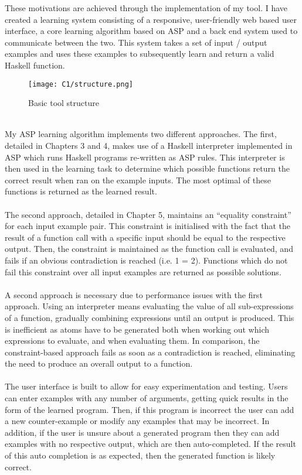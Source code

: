 These motivations are achieved through the implementation of my tool. I have created a learning system consisting of a responsive, user-friendly web based user interface, a core learning algorithm based on ASP and a back end system used to communicate between the two. This system takes a set of input / output examples and uses these examples to subsequently learn and return a valid Haskell function. \\

\begin{figure}[h!]
\texttt{[image: C1/structure.png]}
\caption{Basic tool structure}
\end{figure}
\mbox{}\\
My ASP learning algorithm implements two different approaches. The first, detailed in Chapters 3 and 4, makes use of a Haskell interpreter implemented in ASP which runs Haskell programs re-written as ASP rules. This interpreter is then used in the learning task to determine which possible functions return the correct result when ran on the example inputs. The most optimal of these functions is returned as the learned result. \\ \\
The second approach, detailed in Chapter 5, maintains an ``equality constraint'' for each input example pair. This constraint is initialised with the fact that the result of a function call with a specific input should be equal to the respective output. Then, the constraint is maintained as the function call is evaluated, and fails if an obvious contradiction is reached (i.e. 1 = 2). Functions which do not fail this constraint over all input examples are returned as possible solutions.\\ \\
A second approach is necessary due to performance issues with the first approach. Using an interpreter means evaluating the value of all sub-expressions of a function, gradually combining expressions until an output is produced. This is inefficient as atoms have to be generated both when working out which expressions to evaluate, and when evaluating them. In comparison, the constraint-based approach fails as soon as a contradiction is reached, eliminating the need to produce an overall output to a function. \\ \\
The user interface is built to allow for easy experimentation and testing. Users can enter examples with any number of arguments, getting quick results in the form of the learned program. Then, if this program is incorrect the user can add a new counter-example or modify any examples that may be incorrect. In addition, if the user is unsure about a generated program then they can add examples with no respective output, which are then auto-completed. If the result of this auto completion is as expected, then the generated function is likely correct. \\ \\
